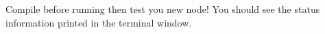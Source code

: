 \documentclass[12pt]{article}
\begin{document}
\begin{description}[labelindent=1cm]
    \item Compile before running then test you new node! You should see the status information printed in the terminal window.
    
    
\end{description}    
\end{document}
